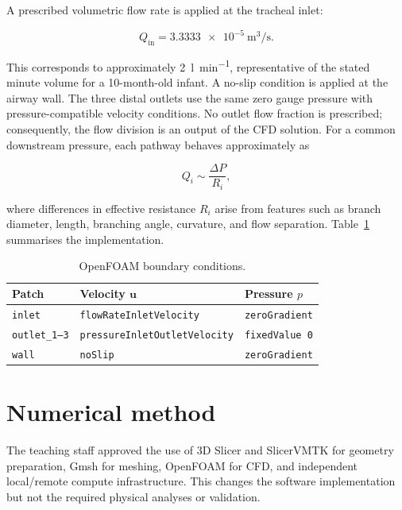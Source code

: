 \documentclass[11pt,a4paper]{article}
\begin{document}
A prescribed volumetric flow rate is applied at the tracheal inlet:

\begin{equation}
  Q_{\mathrm{in}} = \SI{3.3333e-5}{\metre\cubed\per\second}.
\end{equation}

This corresponds to approximately \SI{2}{\litre\per\minute}, representative
of the stated minute volume for a 10-month-old infant. A no-slip condition is
applied at the airway wall. The three distal outlets use the same zero gauge
pressure with pressure-compatible velocity conditions. No outlet flow fraction
is prescribed; consequently, the flow division is an output of the CFD solution.
For a common downstream pressure, each pathway behaves approximately as

\begin{equation}
  Q_i \sim \frac{\Delta P}{R_i},
\end{equation}

where differences in effective resistance $R_i$ arise from features such as
branch diameter, length, branching angle, curvature, and flow separation.
Table~\ref{tab:bc} summarises the implementation.

\begin{table}[htbp]
  \centering
  \caption{OpenFOAM boundary conditions.}
  \label{tab:bc}
  \begin{tabular}{@{}lll@{}}
    \toprule
    Patch & Velocity $\mathbf{u}$ & Pressure $p$ \\
    \midrule
    \texttt{inlet} & \texttt{flowRateInletVelocity} & \texttt{zeroGradient} \\
    \texttt{outlet\_1--3} & \texttt{pressureInletOutletVelocity} & \texttt{fixedValue 0} \\
    \texttt{wall} & \texttt{noSlip} & \texttt{zeroGradient} \\
    \bottomrule
  \end{tabular}
\end{table}

\section{Numerical method}
\label{sec:numerics}

The teaching staff approved the use of 3D Slicer and SlicerVMTK for geometry
preparation, Gmsh for meshing, OpenFOAM for CFD, and independent local/remote
compute infrastructure. This changes the software implementation but not the
required physical analyses or validation.
\end{document}
